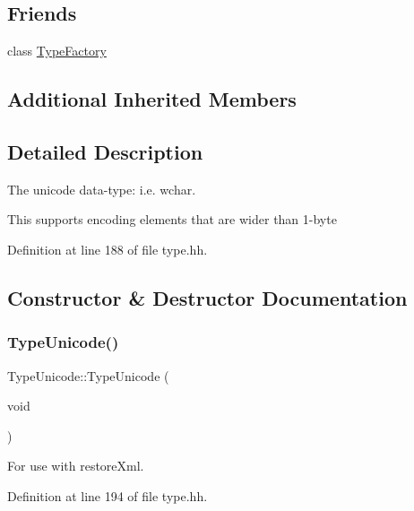 \subsection*{Friends}
\begin{DoxyCompactItemize}
\item 
class \mbox{\hyperlink{class_type_unicode_ac8c1945d0a63785e78b3e09a13226ed6}{Type\+Factory}}
\end{DoxyCompactItemize}
\subsection*{Additional Inherited Members}


\subsection{Detailed Description}
The unicode data-\/type\+: i.\+e. wchar. 

This supports encoding elements that are wider than 1-\/byte 

Definition at line 188 of file type.\+hh.



\subsection{Constructor \& Destructor Documentation}
\mbox{\label{class_type_unicode_a4827b7df37d1775c626997f2839df772}} 
\subsubsection{\texorpdfstring{TypeUnicode()}{TypeUnicode()}\hspace{0.1cm}{\footnotesize\ttfamily [1/3]}}
{\footnotesize\ttfamily Type\+Unicode\+::\+Type\+Unicode (\begin{DoxyParamCaption}\item[{void}]{ }\end{DoxyParamCaption})\hspace{0.3cm}{\ttfamily [inline]}}



For use with restore\+Xml. 



Definition at line 194 of file type.\+hh.

